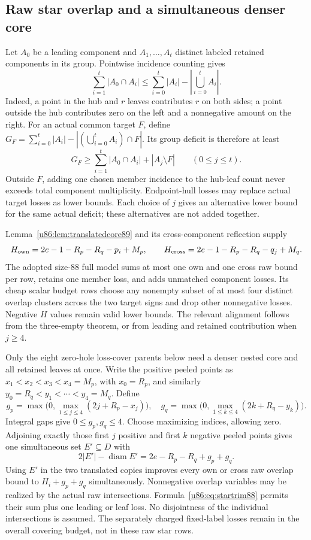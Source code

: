 \documentclass[11pt,a4paper]{article}
\theoremstyle{remark}
\begin{document}
\subsection{Raw star overlap and a simultaneous denser core}
Let $A_0$ be a leading component and $A_1,\ldots,A_t$ distinct labeled
retained components in its group. Pointwise incidence counting gives
\begin{equation}\label{u86:eq:starraw88}
 \sum_{i=1}^t|A_0\cap A_i|
       \le\sum_{i=0}^t|A_i|-\left|\bigcup_{i=0}^t A_i\right|.
\end{equation}
Indeed, a point in the hub and $r$ leaves contributes $r$ on both
sides; a point outside the hub contributes zero on the left and a
nonnegative amount on the right.
For an actual common target $F$, define
$G_F=\sum_{i=0}^t|A_i|-|(\bigcup_{i=0}^tA_i)\cap F|$.
Its group deficit is therefore at least
\begin{equation}\label{u86:eq:startrim88}
 G_F\ge\sum_{i=1}^t|A_0\cap A_i|+|A_j\setminus F|
 \qquad(0\le j\le t).
\end{equation}
Outside $F$, adding one chosen member incidence to the hub-leaf count
never exceeds total component multiplicity. Endpoint-hull losses may
replace actual target losses as lower bounds.
Each choice of $j$ gives an alternative lower bound for the same
actual deficit; these alternatives are not added together.

Lemma~\ref{u86:lem:translatedcore89} and its cross-component reflection
supply
\[
 H_{\rm own}=2e-1-R_p-R_q-p_i+M_p,
 \qquad H_{\rm cross}=2e-1-R_p-R_q-q_j+M_q.
\]
The adopted size-88 full model sums at most one own and one cross raw
bound per row, retains one member loss, and adds unmatched component
losses. Its cheap scalar budget rows choose any nonempty subset of at
most four distinct overlap clusters across the two target signs and
drop other nonnegative losses. Negative $H$ values remain valid lower
bounds. The relevant alignment follows from the three-empty theorem,
or from leading and retained contribution when $j\ge4$.

Only the eight zero-hole loss-cover parents below need a denser nested
core and all retained leaves at once. Write the positive peeled points
as $x_1<x_2<x_3<x_4=M_p$, with $x_0=R_p$, and similarly
$y_0=R_q<y_1<\cdots<y_4=M_q$. Define
\[
 g_p=\max\bigl(0,\max_{1\le j\le4}(2j+R_p-x_j)\bigr),
 \quad
 g_q=\max\bigl(0,\max_{1\le k\le4}(2k+R_q-y_k)\bigr).
\]
Integral gaps give $0\le g_p,g_q\le4$.
Choose maximizing indices, allowing zero. Adjoining exactly those first
$j$ positive and first $k$ negative peeled points gives one simultaneous
set $E'\subseteq D$ with
\[
 2|E'|-\operatorname{diam}E'=2e-R_p-R_q+g_p+g_q.
\]
Using $E'$ in the two translated copies improves every own or cross
raw overlap bound to $H_i+g_p+g_q$ simultaneously.
Nonnegative overlap variables may be realized by the actual raw
intersections. Formula~\eqref{u86:eq:startrim88} permits their sum plus one
leading or leaf loss. No disjointness of the individual intersections
is assumed. The separately charged fixed-label losses remain in the
overall covering budget, not in these raw star rows.
\end{document}

